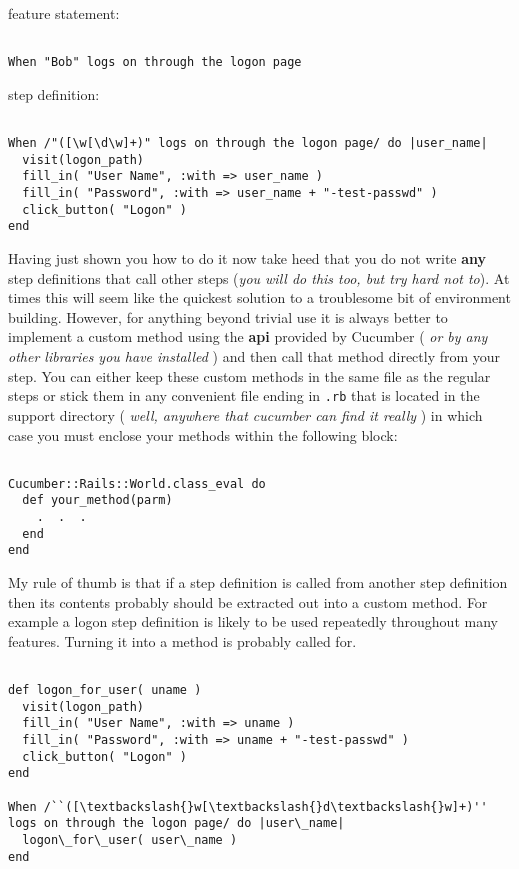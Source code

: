 feature statement:
\begin{verbatim}

When "Bob" logs on through the logon page

\end{verbatim}

step definition:
\begin{verbatim}

When /"([\w[\d\w]+)" logs on through the logon page/ do |user_name|
  visit(logon_path)
  fill_in( "User Name", :with => user_name )
  fill_in( "Password", :with => user_name + "-test-passwd" )
  click_button( "Logon" )
end

\end{verbatim}

Having just shown you how to do it now take heed that you do not write \textbf{any} step definitions that call other steps (\emph{you will do this too, but try hard not to}).  At times this will seem like the quickest solution to a troublesome bit of environment building.  However, for anything beyond trivial use it is always better to implement a custom method using the \textbf{api} provided by Cucumber ( \emph{or by any other libraries you have installed} ) and then call that method directly from your step.  You can either keep these custom methods in the same file as the regular steps or stick them in any convenient file ending in \verb+.rb+ that is located in the support directory ( \emph{well, anywhere that cucumber can find it really} ) in which case you must enclose your methods within the following block:
\begin{verbatim}

Cucumber::Rails::World.class_eval do
  def your_method(parm)
    .  .  .
  end
end

\end{verbatim}

My rule of thumb is that if a step definition is called from another step definition then its contents probably should be extracted out into a custom method.  For example a logon step definition is likely to be used repeatedly throughout many features.  Turning it into a method is probably called for.
\begin{verbatim}

def logon_for_user( uname )
  visit(logon_path)
  fill_in( "User Name", :with => uname )
  fill_in( "Password", :with => uname + "-test-passwd" )
  click_button( "Logon" )
end

When /``([\textbackslash{}w[\textbackslash{}d\textbackslash{}w]+)'' logs on through the logon page/ do |user\_name|
  logon\_for\_user( user\_name )
end

\end{verbatim}

